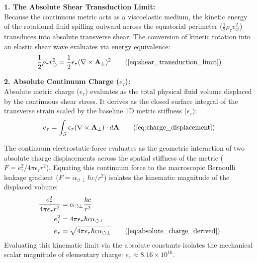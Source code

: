 \documentclass[11pt, a4paper]{article}
\begin{document}
\textbf{1. The Absolute Shear Transduction Limit:} \\
Because the continuous metric acts as a viscoelastic medium, the kinetic energy of the rotational fluid spilling outward across the equatorial perimeter ($\frac{1}{2}\rho_{\tau} v_{\circlearrowleft}^2$) transduces into absolute transverse shear. The conversion of kinetic rotation into an elastic shear wave evaluates via energy equivalence:
\begin{equation}
    \frac{1}{2}\rho_{\tau} v_{\circlearrowleft}^2 = \frac{1}{2}\epsilon_{\tau} (\nabla \times \mathbf{A}_{\perp})^2 \tag{\ref{eq:shear_transduction_limit}}
\end{equation}

\textbf{2. Absolute Continuum Charge ($e_{\tau}$):} \\
Absolute metric charge ($e_{\tau}$) evaluates as the total physical fluid volume displaced by the continuous shear stress. It derives as the closed surface integral of the transverse strain scaled by the baseline 1D metric stiffness ($\epsilon_{\tau}$):
\begin{equation}
    e_{\tau} = \int_S \epsilon_{\tau} (\nabla \times \mathbf{A}_{\perp}) \cdot d\mathbf{A} \tag{\ref{eq:charge_displacement}}
\end{equation}

The continuum electrostatic force evaluates as the geometric interaction of two absolute charge displacements across the spatial stiffness of the metric ($F = e_{\tau}^2 / 4\pi \epsilon_{\tau} r^2$). Equating this continuum force to the macroscopic Bernoulli leakage gradient ($F = \alpha_{\circlearrowleft \perp} \hbar c / r^2$) isolates the kinematic magnitude of the displaced volume:
\begin{align}
    \frac{e_{\tau}^2}{4\pi \epsilon_{\tau} r^2} &= \alpha_{\circlearrowleft \perp} \frac{\hbar c}{r^2} \nonumber \\
    e_{\tau}^2 &= 4\pi \epsilon_{\tau} \hbar c \alpha_{\circlearrowleft \perp} \nonumber \\
    e_{\tau} &= \sqrt{4\pi \epsilon_{\tau} \hbar c \alpha_{\circlearrowleft \perp}} \tag{\ref{eq:absolute_charge_derived}}
\end{align}
Evaluating this kinematic limit via the absolute constants isolates the mechanical scalar magnitude of elementary charge: $e_{\tau} \approx 8.16 \times 10^{16}$.
\end{document}
